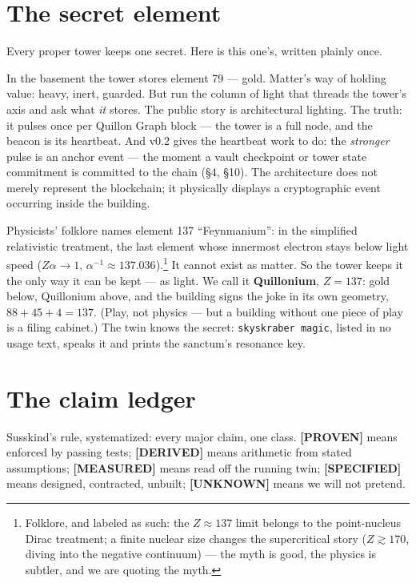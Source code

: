 \documentclass[11pt,a4paper]{article}
\newcommand{\claim}[1]{\textcolor{qsteel}{\textbf{\footnotesize[#1]}}}
\begin{document}
\section{The secret element}
\label{sec:magic}

Every proper tower keeps one secret. Here is this one's, written plainly once.

In the basement the tower stores element 79 --- gold. Matter's way of holding
value: heavy, inert, guarded. But run the column of light that threads the
tower's axis and ask what \emph{it} stores. The public story is architectural
lighting. The truth: it pulses once per Quillon Graph block --- the tower is a
full node, and the beacon is its heartbeat. And v0.2 gives the heartbeat work to
do: the \emph{stronger} pulse is an anchor event --- the moment a vault checkpoint
or tower state commitment is committed to the chain (\S4, \S10). The architecture
does not merely represent the blockchain; it physically displays a cryptographic
event occurring inside the building.

Physicists' folklore names element 137 ``Feynmanium'': in the simplified
relativistic treatment, the last element whose innermost electron stays below
light speed ($Z\alpha \to 1$, $\alpha^{-1} \approx 137.036$).\footnote{Folklore,
and labeled as such: the $Z \approx 137$ limit belongs to the point-nucleus Dirac
treatment; a finite nuclear size changes the supercritical story ($Z \gtrsim
170$, diving into the negative continuum) --- the myth is good, the physics is
subtler, and we are quoting the myth.} It cannot exist as matter. So the tower
keeps it the only way it can be kept --- as light. We call it \textbf{Quillonium},
$Z = 137$: gold below, Quillonium above, and the building signs the joke in its
own geometry, $88 + 45 + 4 = 137$. (Play, not physics --- but a building without
one piece of play is a filing cabinet.) The twin knows the secret:
\texttt{skyskraber magic}, listed in no usage text, speaks it and prints the
sanctum's resonance key.

\section{The claim ledger}

Susskind's rule, systematized: every major claim, one class. \claim{PROVEN} means
enforced by passing tests; \claim{DERIVED} means arithmetic from stated
assumptions; \claim{MEASURED} means read off the running twin;
\claim{SPECIFIED} means designed, contracted, unbuilt; \claim{UNKNOWN} means we
will not pretend.
\end{document}
